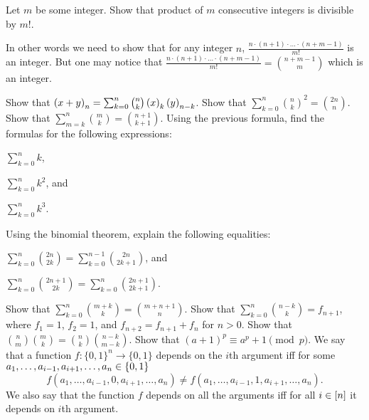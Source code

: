 \begin{chapterendexercises}
  \exercise Let $m$ be some integer. Show that product of $m$ consecutive
    integers is divisible by $m!$.
    \begin{solution}
     In other words we need to show that for any integer $n$, 
     $\frac{n \cdot (n + 1) \cdot \dots \cdot (n + m - 1)}{m!}$ is an integer. 
     But one may notice that 
     $\frac{n \cdot (n + 1) \cdot \dots \cdot (n + m - 1)}{m!} = 
      \binom{n + m - 1}{m}$ which is an integer.
    \end{solution}
  \exercise Show that
    $\numberOfPermutations[n]{x + y} = \sum_{k = 0}^n \binom{n}{k}
      \numberOfPermutations[k]{x} \numberOfPermutations[n - k]{y}$.
  \exercise Show that
    $\sum_{k = 0}^n \binom{n}{k}^2 = \binom{2n}{n}$.
  \exercise Show that $\sum_{m = k}^n \binom{m}{k} =
    \binom{n + 1}{k + 1}$.
  \exercise Using the previous formula, find the formulas for the following
    expressions:
    \begin{enumerate*}
      \item $\sum_{k = 0}^n k$,
      \item $\sum_{k = 0}^n k^2$, and
      \item $\sum_{k = 0}^n k^3$.
    \end{enumerate*}
  \exercise Using the binomial theorem, explain the following equalities:
    \begin{enumerate*}
      \item $\sum_{k = 0}^{n} \binom{2n}{2k} =
        \sum_{k = 0}^{n - 1} \binom{2n}{2k + 1}$,
        and
      \item $\sum_{k = 0}^{n} \binom{2n + 1}{2k} =
        \sum_{k = 0}^n \binom{2n + 1}{2k + 1}$.
    \end{enumerate*}

  \exercise[recommended] Show that $\sum_{k = 0}^n \binom{m + k}{k} =
    \binom{m + n + 1}{n}$.
  \exercise Show that $\sum_{k = 0}^n \binom{n - k}{k} = f_{n + 1}$,
    where $f_1 = 1$, $f_2 = 1$, and $f_{n + 2} = f_{n + 1} + f_n$ for $n > 0$.
  \exercise Show that $\binom{n}{m} \binom{m}{k} =
    \binom{n}{k} \binom{n - k}{m - k}$.
  \exercise[recommended] Show that
    $(a + 1)^p \equiv a^p + 1 \pmod{p}$.
  \exercise[recommended] We say that a function $f : \{0, 1\}^n \to \{0, 1\}$ depends on the
    $i$th argument iff for some
    $a_1, \dots, a_{i - 1}, a_{i + 1}, \dots, a_n \in \set{0, 1}$
    \[
      f(a_1, \dots, a_{i - 1}, 0, a_{i + 1}, \dots, a_n) \neq
      f(a_1, \dots, a_{i - 1}, 1, a_{i + 1}, \dots, a_n).
    \]
    We also say that the function $f$ depends on all the arguments iff for all
    $i \in {[{n}]}$ it depends on $i$th argument.


\end{chapterendexercises}
